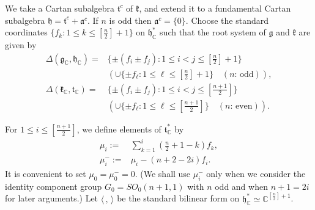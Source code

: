 We take a Cartan subalgebra ${\mathfrak{t}}^c$ of ${\mathfrak{k}}$, 
 and extend it to a fundamental Cartan subalgebra
 ${\mathfrak{h}}={\mathfrak{t}}^c + {\mathfrak{a}}^c$.  
If $n$ is odd then ${\mathfrak{a}}^c=\{0\}$.  
Choose the standard coordinates
 $\{f_k: 1 \le k \le [\frac n 2]+1\}$
 on ${\mathfrak{h}}_{\mathbb{C}}^{\ast}$
 such that the root system of ${\mathfrak{g}}$
 and ${\mathfrak{k}}$ are given by 
\begin{align*}
\Delta({\mathfrak{g}}_{\mathbb{C}}, {\mathfrak{h}}_{\mathbb{C}})
=&\{\pm(f_i \pm f_j) : 1 \le i < j \le [\frac n2]+1\}
\\
&\left(\cup \{\pm f_{\ell} : 1 \le \ell \le [\frac n2]+1\}
 \quad(\text{$n$: odd})\right), 
\\
\Delta({\mathfrak{k}}_{\mathbb{C}}, {\mathfrak{t}}_{\mathbb{C}})
=&\{\pm(f_i \pm f_j) : 1 \le i < j \le [\frac {n+1}2] \}
\\
&\left(\cup \{\pm f_{\ell} : 1 \le \ell \le [\frac {n+1}2]\}
 \quad(\text{$n$: even})\right).  
\end{align*}

For $1 \le i \le [\frac {n+1}2]$, 
 we define elements of ${\mathfrak{t}}_{\mathbb{C}}^{\ast}$
 by 
\begin{align*}
\mu_i:=&\sum_{k=1}^i (\frac n 2+1-k) f_k, 
\\
\mu_i^-:=& \mu_i- (n +2-2i) f_i. 
\end{align*}
It is convenient to set 
 $\mu_0=\mu_0^-=0$.  
(We shall use $\mu_i^-$
 only when we consider the identity component group 
 $G_0=SO_0(n+1,1)$
 with $n$ odd and when $n+1=2i$
 for later arguments.)
Let $\langle \, , \, \rangle$
 be the standard bilinear form
 on ${\mathfrak {h}}_{\mathbb{C}}^{\ast} \simeq {\mathbb{C}}^{[\frac n2 ]+1}$. 

